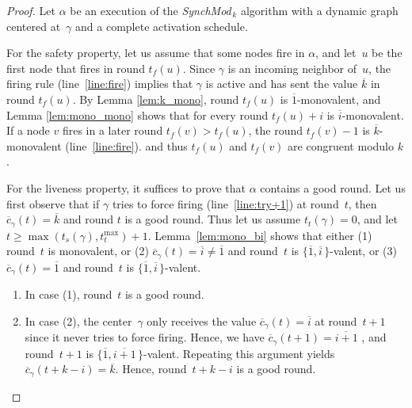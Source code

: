 \documentclass{article}
\newcommand{\cent}{\gamma}
\newcommand{\tf}{t_{f}}
\newcommand{\try}{t_{t}}
\newcommand{\SM}{{\em SynchMod}$_{\,k}$ }
\begin{document}
\begin{proof}
Let $\alpha$ be an execution of the \SM algorithm with a dynamic graph centered at~$\cent$ 
	and a complete activation schedule.
	
For the safety property, let us assume that some nodes fire in $\alpha$, and let~$u$ be the first node that fires in round $\tf(u)$.
Since $\cent $ is an incoming neighbor of~$u$, the firing rule (line~\ref{line:fire}) implies that $\cent$ is active
	and has sent the value  $\overline{k}$ in round $\tf(u)$.
By Lemma \ref{lem:k_mono},   round $\tf(u)$ is $\overline{1}$-monovalent, and
	Lemma \ref{lem:mono_mono} shows that for every round $\tf(u)+i$ is $\overline{i}$-monovalent.
If a node $v$ fires in a later round $\tf(v) > \tf(u)$, the round $\tf(v)-1$  is $\overline{k}$-monovalent (line~\ref{line:fire}).
	and thus $\tf(u)$ and $\tf(v)$ are congruent modulo $k$.
		
For the liveness property, it suffices to prove that  $\alpha$ contains a good round.
Let us first observe that if $\cent$ tries to force firing (line~\ref{line:try+1}) at round~$t$,
	 then $ \overline{c}_{\cent}(t) = \overline{k}$ and round $t$ is a good round.
Thus let us assume  $\try(\cent) = 0$, and  let $t \geq \max (t_s(\cent) , \try^{\max}) +1$.
Lemma~\ref{lem:mono_bi}  shows that either (1) round~$t$ is monovalent, 
	or (2) $ \overline{c}_{\cent}(t) = \overline{i} \neq  \overline{1} $ and round~$t$ is $ \{\overline{1}, \overline{i} \, \}$-valent,
	or (3) $ \overline{c}_{\cent}(t) = \overline{1}$ and round~$t$ is $ \{\overline{1}, \overline{i} \, \}$-valent.
\begin{enumerate}
\item In case (1), round~$t$ is a good round.

\item In case (2), the center~$\cent$ only receives the value $ \overline{c}_{\cent}(t) = \overline{i}$ at round~$t+1$ 
since it never tries to force firing.
Hence, we have $ \overline{c}_{\cent}(t + 1)  = \overline{i +1} $ , and round~$t+1 $ is $ \{\overline{1}, \overline{i+1} \, \}$-valent.
Repeating this argument yields $ \overline{c}_{\cent}(t + k-i )  = \overline{ k } $.
Hence, round~$t +k-i$ is a good round.


\end{enumerate}
\end{proof}
\end{document}
